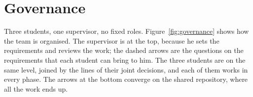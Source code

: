 \chapter*{Governance}

Three students, one supervisor, no fixed roles. Figure~\ref{fig:governance} shows how the team is
organised. The supervisor is at the top, because he sets the requirements and reviews the work; the
dashed arrows are the questions on the requirements that each student can bring to him. The three
students are on the same level, joined by the lines of their joint decisions, and each of them
works in every phase. The arrows at the bottom converge on the shared repository, where all the work
ends up.

